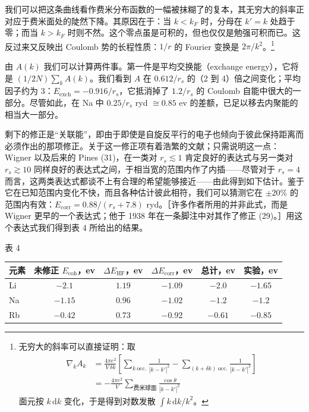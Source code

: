 我们可以把这条曲线看作费米分布函数的一幅被抹糊了的复本，其无穷大的斜率正对应于费米面处的陡然下降。其原因在于：当 $k < k_F$ 时，分母在 $k' = k$ 处趋于零；而当 $k > k_F$ 时则不然。这个零点虽是可积的，但也仅仅是勉强可积而已。这反过来又反映出 Coulomb 势的长程性质：$1/r$ 的 Fourier 变换是 $2\pi/k^2$。\footnote{无穷大的斜率可以直接证明：取
\begin{align*}
\nabla_k A_k &= \frac{4\pi e^2}{V\,\delta k}\left[\sum_{k\ \mathrm{occ.}}\frac{1}{|k-k'|^2} - \sum_{(k+\delta k)\ \mathrm{occ.}}\frac{1}{|k-k'|^2}\right]\\
&= -\frac{4\pi e^2}{V}\sum_{\text{费米球面}}\frac{\cos\theta}{|k-k'|^2}
\end{align*}
面元按 $k\,\mathrm{d}k$ 变化，于是得到对数发散 $\int k\,\mathrm{d}k/k^2$。}


由 $A(k)$ 我们可以计算两件事。第一件是平均交换能（exchange energy），它将是 $(1/2N)\sum_k A(k)$。我们看到 $A$ 在 $0.612/r_s$ 的（2 到 4）倍之间变化；平均因子约为 3：$E_{\mathrm{exch}} = -0.916/r_s$，它抵消掉了 $1.2/r_s$ 的 Coulomb 自能中很大的一部分。尽管如此，在 Na 中 $0.25/r_s$ ryd $\cong 0.85$ ev 的差额，已足以移去内聚能的相当大一部分。

剩下的修正是“关联能”，即由于即使是自旋反平行的电子也倾向于彼此保持距离而必须作出的那项修正。关于这一修正项有着浩繁的文献；只需说明这一点：Wigner 以及后来的 Pines (31)，在一类对 $r_s \lesssim 1$ 肯定良好的表达式与另一类对 $r_s \gtrsim 10$ 同样良好的表达式之间，于相当宽的范围内作了内插——尽管对于 $r_s = 4$ 而言，这两类表达式都谈不上有合理的希望能够接近——由此得到如下估计。鉴于它在已知范围内变化不快，而且各种估计彼此相符，我们可以猜测它在 $\pm 20\%$ 的范围内有效：$E_{\mathrm{corr}} = 0.88/(r_s + 7.8)$ ryd。［许多作者所用的并非此式，而是 Wigner 更早的一个表达式；他于 1938 年在一条脚注中对其作了修正 (29)。］用这个表达式我们得到表 4 所给出的结果。

\begin{center}
表 4

\begin{tabular}{lccccc}
\toprule
元素 & 未修正 $E_{\mathrm{coh}}$，ev & $\Delta E_{\mathrm{HF}}$，ev & $\Delta E_{\mathrm{corr}}$，ev & 总计，ev & 实验，ev\\
\midrule
Li & $-2.1$ & $1.19$ & $-1.09$ & $-2.0$ & $-1.65$\\
Na & $-1.15$ & $0.96$ & $-1.02$ & $-1.2$ & $-1.2$\\
Rb & $-0.42$ & $0.73$ & $-0.92$ & $-0.61$ & $-0.85$\\
\bottomrule
\end{tabular}
\end{center}

